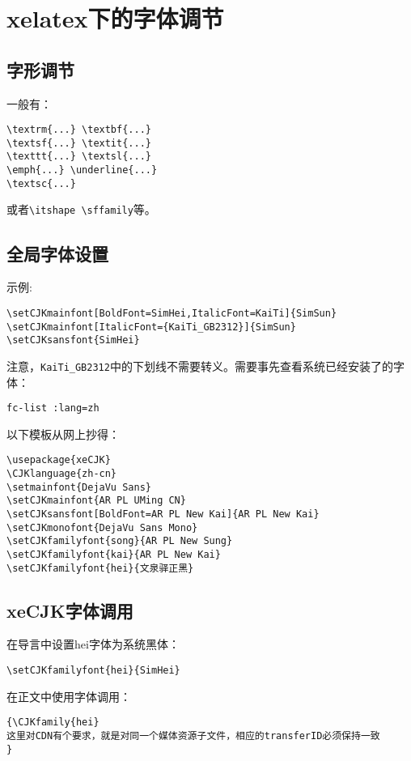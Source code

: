 \section{xelatex下的字体调节}

\subsection{字形调节}
一般有：
\begin{verbatim}
\textrm{...} \textbf{...}
\textsf{...} \textit{...} 
\texttt{...} \textsl{...}
\emph{...} \underline{...}
\textsc{...} 
\end{verbatim}
或者\verb+\itshape \sffamily+等。


\subsection{全局字体设置}
示例:
\begin{verbatim}
\setCJKmainfont[BoldFont=SimHei,ItalicFont=KaiTi]{SimSun}
\setCJKmainfont[ItalicFont={KaiTi_GB2312}]{SimSun}
\setCJKsansfont{SimHei}
\end{verbatim}
注意，\verb+KaiTi_GB2312+中的下划线不需要转义。需要事先查看系统已经安装了的字体：
\begin{verbatim}
fc-list :lang=zh
\end{verbatim}
以下模板从网上抄得：
\begin{verbatim}
\usepackage{xeCJK}
\CJKlanguage{zh-cn}
\setmainfont{DejaVu Sans}
\setCJKmainfont{AR PL UMing CN}
\setCJKsansfont[BoldFont=AR PL New Kai]{AR PL New Kai}
\setCJKmonofont{DejaVu Sans Mono}
\setCJKfamilyfont{song}{AR PL New Sung}
\setCJKfamilyfont{kai}{AR PL New Kai}
\setCJKfamilyfont{hei}{文泉驿正黑}
\end{verbatim}

\subsection{xeCJK字体调用}
在导言中设置hei字体为系统黑体：
\begin{verbatim}
\setCJKfamilyfont{hei}{SimHei}
\end{verbatim}
在正文中使用字体调用：
\begin{verbatim}
{\CJKfamily{hei}
这里对CDN有个要求，就是对同一个媒体资源子文件，相应的transferID必须保持一致
}
\end{verbatim}






